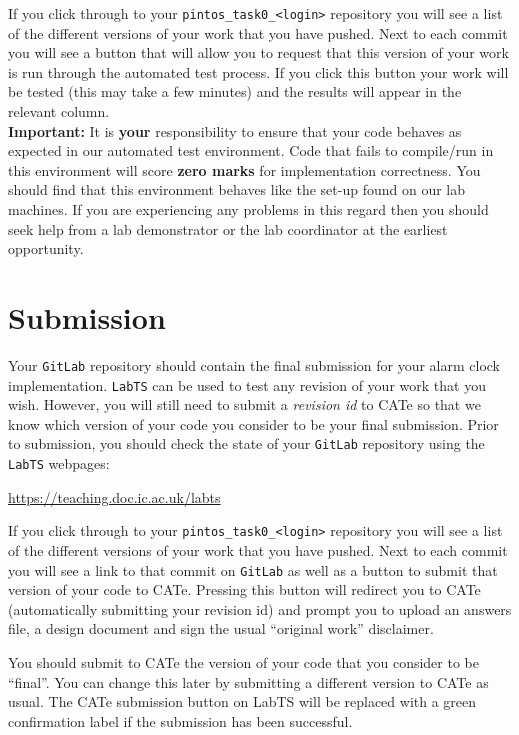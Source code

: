 \documentclass[a4paper,12pt]{article}
\newcommand{\shell}[1]{\lstinline!#1!}
\begin{document}
If you click through to your \shell{pintos_task0_<login>} repository you will see a list of the different versions of your work that you have pushed.
Next to each commit you will see a button that will allow you to request that this version of your work is run through the automated test process.
If you click this button your work will be tested (this may take a few minutes) and the results will appear in the relevant column.\\

{\bf Important:} It is {\bf your} responsibility to ensure that your code behaves as expected in our automated test environment. 
Code that fails to compile/run in this environment will score {\bf zero marks} for implementation correctness.
You should find that this environment behaves like the set-up found on our lab machines.
If you are experiencing any problems in this regard then you should seek help from a lab demonstrator or the lab coordinator at the earliest opportunity.\\


\section*{Submission}
Your \shell{GitLab} repository should contain the final submission for your alarm clock implementation.
\shell{LabTS} can be used to test any revision of your work that you wish.
However, you will still need to submit a \emph{revision id} to CATe so that we know which version of your code you consider to be your final submission. 
Prior to submission, you should check the state of your \shell{GitLab} repository using the \shell{LabTS} webpages:

\url{https://teaching.doc.ic.ac.uk/labts}

\noindent If you click through to your \shell{pintos_task0_<login>} repository you will see a list of the different versions of your work that you have pushed.
Next to each commit you will see a link to that commit on \shell{GitLab} as well as a button to submit that version of your code to CATe.
Pressing this button will redirect you to CATe (automatically submitting your revision id)
and prompt you to upload an answers file, a design document and sign the usual ``original work'' disclaimer.

You should submit to CATe the version of your code that you consider to be ``final''.
You can change this later by submitting a different version to CATe as usual.
The CATe submission button on LabTS will be replaced with a green confirmation label if the submission has been successful.
\end{document}
